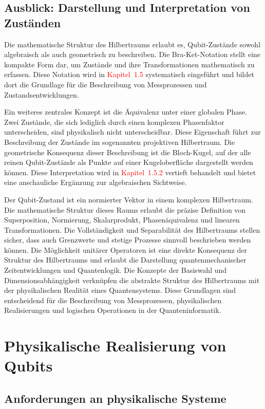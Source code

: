 \subsection{Ausblick: Darstellung und Interpretation von Zuständen}

Die mathematische Struktur des Hilbertraums erlaubt es, Qubit-Zustände sowohl algebraisch als auch geometrisch zu beschreiben. Die Bra-Ket-Notation stellt eine kompakte Form dar, um Zustände und ihre Transformationen mathematisch zu erfassen. Diese Notation wird in  \textcolor{red} {Kapitel~1.5} systematisch eingeführt und bildet dort die Grundlage für die Beschreibung von Messprozessen und Zustandsentwicklungen.

Ein weiteres zentrales Konzept ist die Äquivalenz unter einer globalen Phase. Zwei Zustände, die sich lediglich durch einen komplexen Phasenfaktor unterscheiden, sind physikalisch nicht unterscheidbar. Diese Eigenschaft führt zur Beschreibung der Zustände im sogenannten projektiven Hilbertraum. Die geometrische Konsequenz dieser Beschreibung ist die Bloch-Kugel, auf der alle reinen Qubit-Zustände als Punkte auf einer Kugeloberfläche dargestellt werden können. Diese Interpretation wird in \textcolor{red}{Kapitel~1.5.2} vertieft behandelt und bietet eine anschauliche Ergänzung zur algebraischen Sichtweise.


Der Qubit-Zustand ist ein normierter Vektor in einem komplexen Hilbertraum. Die mathematische Struktur dieses Raums erlaubt die präzise Definition von Superposition, Normierung, Skalarprodukt, Phasenäquivalenz und linearen Transformationen. Die Vollständigkeit und Separabilität des Hilbertraums stellen sicher, dass auch Grenzwerte und stetige Prozesse sinnvoll beschrieben werden können. Die Möglichkeit unitärer Operatoren ist eine direkte Konsequenz der Struktur des Hilbertraums und erlaubt die Darstellung quantenmechanischer Zeitentwicklungen und Quantenlogik. Die Konzepte der Basiswahl und Dimensionsabhängigkeit verknüpfen die abstrakte Struktur des Hilbertraums mit der physikalischen Realität eines Quantensystems. Diese Grundlagen sind entscheidend für die Beschreibung von Messprozessen, physikalischen Realisierungen und logischen Operationen in der Quanteninformatik.

\section{Physikalische Realisierung von Qubits }
\label{sec: Physikalische Realisierung}
\subsection{Anforderungen an physikalische Systeme }
\label{subsec: Anforderungen (Allgemein, Divincenzo-Kriterien, Dekohärenz)}
